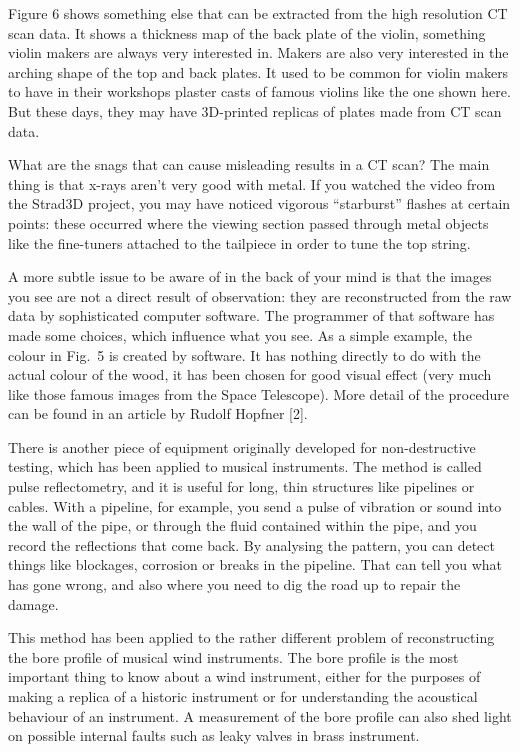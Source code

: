   Figure 6 shows something else that can be extracted from the high resolution 
  CT scan data. It shows a thickness map of the back plate of the violin, 
  something violin makers are always very interested in. Makers are also very 
  interested in the arching shape of the top and back plates. It used to be 
  common for violin makers to have in their workshops plaster casts of famous 
  violins like the one shown here. But these days, they may have 3D-printed 
  replicas of plates made from CT scan data. 

  What are the snags that can cause misleading results in a CT scan? The main 
  thing is that x-rays aren’t very good with metal. If you watched the video 
  from the Strad3D project, you may have noticed vigorous “starburst” flashes 
  at certain points: these occurred where the viewing section passed through 
  metal objects like the fine-tuners attached to the tailpiece in order to tune 
  the top string. 

  A more subtle issue to be aware of in the back of your mind is that the 
  images you see are not a direct result of observation: they are reconstructed 
  from the raw data by sophisticated computer software. The programmer of that 
  software has made some choices, which influence what you see. As a simple 
  example, the colour in Fig.\ 5 is created by software. It has nothing 
  directly to do with the actual colour of the wood, it has been chosen for 
  good visual effect (very much like those famous images from the Space 
  Telescope). More detail of the procedure can be found in an article by Rudolf 
  Hopfner [2]. 

  There is another piece of equipment originally developed for non-destructive 
  testing, which has been applied to musical instruments. The method is called 
  pulse reflectometry, and it is useful for long, thin structures like 
  pipelines or cables. With a pipeline, for example, you send a pulse of 
  vibration or sound into the wall of the pipe, or through the fluid contained 
  within the pipe, and you record the reflections that come back. By analysing 
  the pattern, you can detect things like blockages, corrosion or breaks in the 
  pipeline. That can tell you what has gone wrong, and also where you need to 
  dig the road up to repair the damage. 

  This method has been applied to the rather different problem of 
  reconstructing the bore profile of musical wind instruments. The bore profile 
  is the most important thing to know about a wind instrument, either for the 
  purposes of making a replica of a historic instrument or for understanding 
  the acoustical behaviour of an instrument. A measurement of the bore profile 
  can also shed light on possible internal faults such as leaky valves in brass 
  instrument. 

